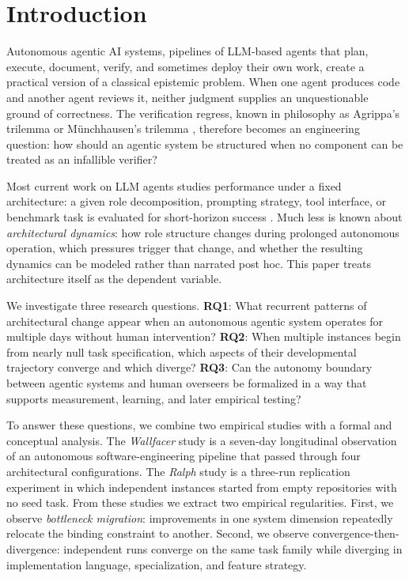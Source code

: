 \section{Introduction}

Autonomous agentic AI systems, pipelines of LLM-based agents that plan, execute, document, verify, and sometimes deploy their own work, create a practical version of a classical epistemic problem. When one agent produces code and another agent reviews it, neither judgment supplies an unquestionable ground of correctness. The verification regress, known in philosophy as Agrippa's trilemma or M\"unchhausen's trilemma \cite{sextus_empiricus,albert1985}, therefore becomes an engineering question: how should an agentic system be structured when no component can be treated as an infallible verifier?

Most current work on LLM agents studies performance under a fixed architecture: a given role decomposition, prompting strategy, tool interface, or benchmark task is evaluated for short-horizon success \cite{li2023camel,wu2024autogen,hong2023metagpt,qian2024chatdev,yang2024sweagent}. Much less is known about \emph{architectural dynamics}: how role structure changes during prolonged autonomous operation, which pressures trigger that change, and whether the resulting dynamics can be modeled rather than narrated post hoc. This paper treats architecture itself as the dependent variable.

We investigate three research questions. \textbf{RQ1}: What recurrent patterns of architectural change appear when an autonomous agentic system operates for multiple days without human intervention? \textbf{RQ2}: When multiple instances begin from nearly null task specification, which aspects of their developmental trajectory converge and which diverge? \textbf{RQ3}: Can the autonomy boundary between agentic systems and human overseers be formalized in a way that supports measurement, learning, and later empirical testing?

To answer these questions, we combine two empirical studies with a formal and conceptual analysis. The \emph{Wallfacer} study is a seven-day longitudinal observation of an autonomous software-engineering pipeline that passed through four architectural configurations. The \emph{Ralph} study is a three-run replication experiment in which independent instances started from empty repositories with no seed task. From these studies we extract two empirical regularities. First, we observe \emph{bottleneck migration}: improvements in one system dimension repeatedly relocate the binding constraint to another. Second, we observe convergence-then-divergence: independent runs converge on the same task family while diverging in implementation language, specialization, and feature strategy.

